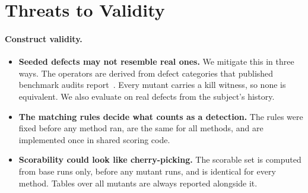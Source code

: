 \section{Threats to Validity}
\label{sec:threats}

\paragraph{Construct validity.}
\begin{itemize}[leftmargin=*]
\item \textbf{Seeded defects may not resemble real ones.} We mitigate this in three ways. The operators are derived from defect categories that published benchmark audits report~\cite{cuadron2025saber,zhu2025establishing}. Every mutant carries a kill witness, so none is equivalent. We also evaluate on real defects from the subject's history.
\item \textbf{The matching rules decide what counts as a detection.} The rules were fixed before any method ran, are the same for all methods, and are implemented once in shared scoring code.
\item \textbf{Scorability could look like cherry-picking.} The scorable set is computed from base runs only, before any mutant runs, and is identical for every method. Tables over all mutants are always reported alongside it.
\end{itemize}

